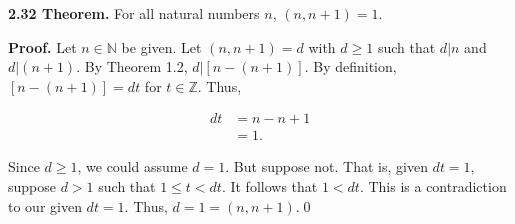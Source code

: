 \documentclass[12pt]{article}
\begin{document}
\noindent\textbf{2.32 Theorem.} For all natural numbers $n$, $(n,n+1)=1$. 

\bigskip

\noindent\textbf{Proof.} Let $n\in\mathbb{N}$ be given. Let $(n,n+1)=d$ with $d\geq 1$ such that $d|n$ and $d|(n+1)$. By Theorem 1.2, $d|[n-(n+1)]$. By definition, $[n-(n+1)]=dt$ for $t\in\mathbb{Z}$. Thus,

\begin{align*}
dt &= n-n+1 \\
&= 1.
\end{align*}

\noindent Since $d\geq 1$, we could assume $d=1$. But suppose not. That is, given $dt=1$, suppose $d>1$ such that $1\leq t < dt$. It follows that $1<dt$. This is a contradiction to our given $dt=1$. Thus, $d=1=(n,n+1)$.\qed
\end{document}
